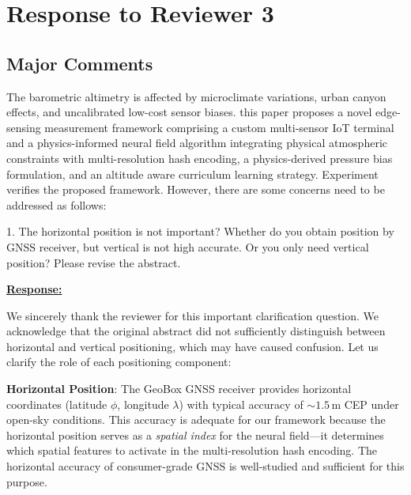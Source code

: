 \newpage
\section{Response to Reviewer 3}

\subsection{Major Comments}

\begin{cmtthree}{}{}
The barometric altimetry is affected by microclimate variations, urban canyon effects, and uncalibrated low-cost sensor biases. this paper proposes a novel edge-sensing measurement framework comprising a custom multi-sensor IoT terminal and a physics-informed neural field algorithm integrating physical atmospheric constraints with multi-resolution hash encoding, a physics-derived pressure bias formulation, and an altitude aware curriculum learning strategy. Experiment verifies the proposed framework. However, there are some concerns need to be addressed as follows:

1. The horizontal position is not important? Whether do you obtain position by GNSS receiver, but vertical is not high accurate. Or you only need vertical position? Please revise the abstract.

\end{cmtthree}

\vspace{0.1cm}
\noindent
\underline{\textbf{Response:}}
\vspace{0.2cm}

We sincerely thank the reviewer for this important clarification question. We acknowledge that the original abstract did not sufficiently distinguish between horizontal and vertical positioning, which may have caused confusion. Let us clarify the role of each positioning component:

\textbf{Horizontal Position}: The GeoBox GNSS receiver provides horizontal coordinates (latitude $\phi$, longitude $\lambda$) with typical accuracy of ${\sim}1.5$\,m CEP under open-sky conditions. This accuracy is adequate for our framework because the horizontal position serves as a \emph{spatial index} for the neural field---it determines which spatial features to activate in the multi-resolution hash encoding. The horizontal accuracy of consumer-grade GNSS is well-studied and sufficient for this purpose.

